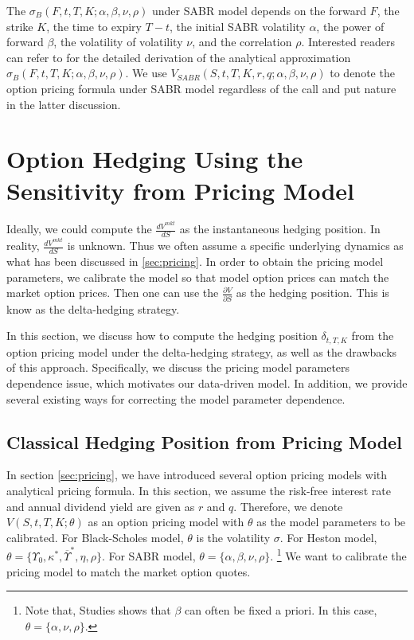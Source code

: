 \documentclass[letterpaper,12pt,titlepage,oneside,final]{book}
\numberwithin{equation}{section}
\theoremstyle{definition}
\newcommand{\Vmkt}{V^{mkt}}
\begin{document}
The $\sigma_{B}(F,t,T,K;\alpha,\beta,\nu,\rho)$ under SABR model depends on the forward $F$, the strike $K$, the time to expiry $T-t$, the initial SABR volatility $\alpha$, the power of forward $\beta$, the volatility of volatility $\nu$, and the correlation $\rho$.  Interested readers can refer to \cite{hagan2002managing} for the detailed derivation of the analytical approximation $\sigma_{B}(F,t,T,K;\alpha,\beta,\nu,\rho)$.  We use $V_{SABR}(S,t,T,K,r,q;\alpha,\beta,\nu,\rho)$ to denote the option pricing formula under SABR model regardless of the call and put nature in the latter discussion.



\section{Option Hedging Using the Sensitivity from Pricing Model}
 Ideally, we could compute the $\frac{d \Vmkt}{d S}$ as the instantaneous hedging position. In reality, $\frac{d \Vmkt}{d S}$ is unknown. Thus we often assume a specific underlying dynamics as what has been discussed in \ref{sec:pricing}. In order to obtain the pricing model parameters, we calibrate the model so that model option prices can match the market option prices. Then one can use the $\frac{\partial V}{\partial S}$ as the hedging position. This is know as the delta-hedging strategy.

 In this section, we discuss how to compute the hedging position $\delta_{t,T,K}$ from the option pricing model under the delta-hedging strategy, as well as the drawbacks of this approach.  Specifically, we discuss the pricing model parameters dependence issue, which motivates our data-driven model. In addition, we provide several existing ways for correcting the model parameter dependence. 


\subsection{Classical Hedging Position from Pricing Model}
\label{sec:Classical}
In section \ref{sec:pricing}, we have introduced several option pricing models with analytical pricing formula. In this section, we assume the risk-free interest rate and annual dividend yield are given as $r$ and $q$. Therefore, we denote  $V(S,t,T,K;\theta)$  as an option pricing model with $\theta$ as the model parameters to be calibrated. For Black-Scholes model,  $\theta$ is the volatility $\sigma$. For Heston model, $\theta=\{\Upsilon_0,\kappa^*,\overline{\Upsilon}^*,\eta,\rho \}$. For SABR model, $\theta=\{\alpha,\beta,\nu,\rho \}$. \footnote{Note that, Studies \cite{hulloptimal,hagan2002managing,hagan2017bartlett} shows that $\beta$ can often be fixed a priori. In this case, $\theta=\{\alpha,\nu,\rho \}$.}
We want to calibrate the pricing model to match the market option quotes. 
\end{document}
